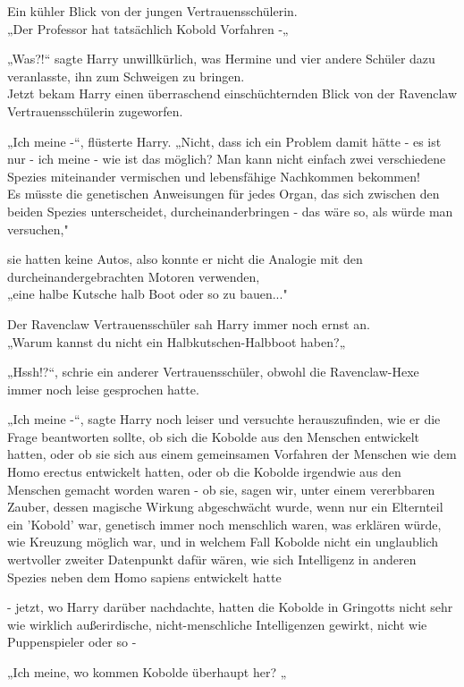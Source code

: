 {Ein kühler Blick von der jungen Vertrauensschülerin.\\ „Der Professor hat tatsächlich Kobold Vorfahren -„

„Was?!“ sagte Harry unwillkürlich, was Hermine und vier andere Schüler dazu veranlasste, ihn zum Schweigen zu bringen.\\ Jetzt bekam Harry einen überraschend einschüchternden Blick von der Ravenclaw Vertrauensschülerin zugeworfen.

„Ich meine -“, flüsterte Harry. „Nicht, dass ich ein Problem damit hätte - es ist nur - ich meine - wie ist das möglich? Man kann nicht einfach zwei verschiedene Spezies miteinander vermischen und lebensfähige Nachkommen bekommen!\\ Es müsste die genetischen Anweisungen für jedes Organ, das sich zwischen den beiden Spezies unterscheidet, durcheinanderbringen - das wäre so, als würde man versuchen,"

sie hatten keine Autos, also konnte er nicht die Analogie mit den durcheinandergebrachten Motoren verwenden,\\ „eine halbe Kutsche halb Boot oder so zu bauen..."

Der Ravenclaw Vertrauensschüler sah Harry immer noch ernst an.\\ „Warum kannst du nicht ein Halbkutschen-Halbboot haben?„

„Hssh!?“, schrie ein anderer Vertrauensschüler, obwohl die Ravenclaw-Hexe immer noch leise gesprochen hatte.

„Ich meine -“, sagte Harry noch leiser und versuchte herauszufinden, wie er die Frage beantworten sollte, ob sich die Kobolde aus den Menschen entwickelt hatten, oder ob sie sich aus einem gemeinsamen Vorfahren der Menschen wie dem Homo erectus entwickelt hatten, oder ob die Kobolde irgendwie aus den Menschen gemacht worden waren - ob sie, sagen wir, unter einem vererbbaren Zauber, dessen magische Wirkung abgeschwächt wurde, wenn nur ein Elternteil ein 'Kobold' war, genetisch immer noch menschlich waren, was erklären würde, wie Kreuzung möglich war, und in welchem Fall Kobolde nicht ein unglaublich wertvoller zweiter Datenpunkt dafür wären, wie sich Intelligenz in anderen Spezies neben dem Homo sapiens entwickelt hatte

- jetzt, wo Harry darüber nachdachte, hatten die Kobolde in Gringotts nicht sehr wie wirklich außerirdische, nicht-menschliche Intelligenzen gewirkt, nicht wie Puppenspieler oder so -

„Ich meine, wo kommen Kobolde überhaupt her? „

}
